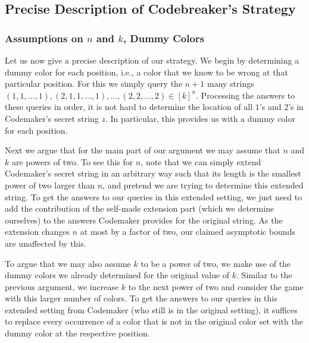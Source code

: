 \documentclass[english,a4paper,11pt]{article}
\begin{document}
{\subsection{Precise Description of Codebreaker's Strategy} 
\label{sec:strategy-description}
 
\subsubsection{Assumptions on $n$ and $k$, Dummy Colors}
\label{sec:preliminaries}
Let us now give a precise description of our strategy. We begin by determining a dummy color for each position, i.e., a color that we know to be wrong at that particular position. For this we simply query  the $n+1$ many strings $(1,1, \dots, 1), (2,1,1, \dots, 1), \dots, (2, 2, \dots, 2)\in [k]^n$. Processing the answers to these queries in order, it is not hard to determine the location of all $1$'s and $2$'s in Codemaker's secret string $z$. In particular, this provides us with a dummy color for each position.


Next we argue that for the main part of our argument we may assume that $n$ and $k$ are powers of two. To see this for $n$, note that we can simply extend Codemaker's secret string in an arbitrary way such that its length is the smallest power of two larger than $n$, and pretend we are trying to determine this extended string. To get the answers to our queries in this extended setting, we just need to add the contribution of the self-made extension part (which we determine ourselves) to the answers Codemaker provides for the original string. As the extension changes $n$ at most by a factor of two, our claimed asymptotic bounds are unaffected by this.

To argue that we may also assume $k$ to be a power of two, we make use of the dummy colors we already determined for the original value of $k$.  Similar to the previous argument, we increase $k$ to the next power of two and consider the game with this larger number of colors. To get the answers to our queries in this extended setting from Codemaker (who still is in the original setting), it suffices to replace every occurrence of a color that is not in the original color set with the dummy color at the respective position.

}
\end{document}
